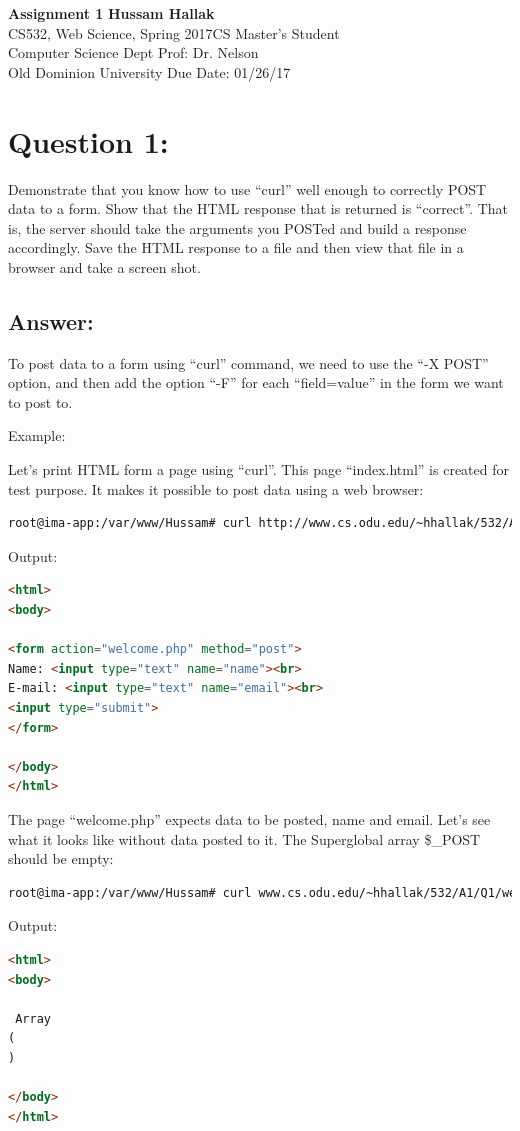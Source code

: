 \documentclass[a4paper, 11pt]{article}
\begin{document}
\noindent
\large\textbf{Assignment 1} \hfill \textbf{Hussam Hallak} \\
\normalsize CS532, Web Science, Spring 2017\hfill CS Master's Student \\
Computer Science Dept \hfill Prof: Dr. Nelson \\
Old Dominion University \hfill Due Date: 01/26/17

\section*{Question 1:}
Demonstrate that you know how to use ``curl'' well enough to correctly POST data to a form. Show that the HTML response that is returned is ``correct''. That is, the server should take the arguments you POSTed and build a response accordingly. Save the HTML response to a file and then view that file in a browser and take a screen shot.

\subsection*{Answer:}
To post data to a form using ``curl'' command, we need to use the ``-X POST'' option, and then add the option ``-F'' for each ``field=value'' in the form we want to post to.

Example: 

Let's print HTML form a page using ``curl''. This page ``index.html'' is created for test purpose. It makes it possible to post data using a web browser:

\begin{lstlisting}[language=bash]
root@ima-app:/var/www/Hussam# curl http://www.cs.odu.edu/~hhallak/532/A1/Q1/index.html

\end{lstlisting}
Output:
\begin{lstlisting}[language=html]
<html>
<body>

<form action="welcome.php" method="post">
Name: <input type="text" name="name"><br>
E-mail: <input type="text" name="email"><br>
<input type="submit">
</form>

</body>
</html>

\end{lstlisting}
The page ``welcome.php'' expects data to be posted, name and email. Let's see what it looks like without data posted to it. The Superglobal array \$\_POST should be empty:

\begin{lstlisting}[language=bash]
root@ima-app:/var/www/Hussam# curl www.cs.odu.edu/~hhallak/532/A1/Q1/welcome.php   

\end{lstlisting}
Output:
\begin{lstlisting}[language=html]     
<html>
<body>

 Array
(
)

</body>
</html>

\end{lstlisting}
\end{document}
